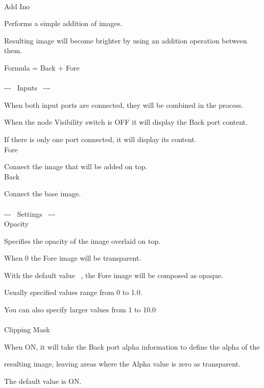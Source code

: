 \documentclass[a4paper,12pt]{article}
\begin{document}
\thispagestyle{empty}

\Large
\noindent \\
Add Ino\medskip
\par
\normalsize
Performs a simple addition of images.\par
Resulting image will become brighter by using an addition operation between them.\par
Formula = Back + Fore\\
\\
-{-}- \ Inputs \ -{-}-\par
When both input ports are connected, they will be combined in the process.\par
When the node Visibility switch is OFF it will display the Back port content.\par
If there is only one port connected, it will display its content.\\
Fore\par
Connect the image that will be added on top.\\
Back\par
Connect the base image.\\
\\
-{-}- \ Settings \ -{-}-\\
Opacity\par
Specifies the opacity of the image overlaid on top.\par
When 0 the Fore image will be transparent.\par
With the default value \textquotedbl \ , the Fore image will be composed as opaque.\par
Usually specified values range from 0 to 1.0.\par
You can also specify larger values from 1 to 10.0\\
\\
Clipping Mask\par
When ON, it will take the Back port alpha information to define the alpha of the\par 
resulting image, leaving areas where the Alpha value is zero as transparent.\par
The default value is ON.
\end{document}
